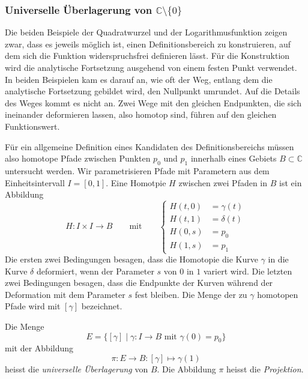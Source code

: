 \subsubsection{Universelle Überlagerung von $\mathbb{C}\setminus\{0\}$}
Die beiden Beispiele der Quadratwurzel und der Logarithmusfunktion
zeigen zwar, dass es jeweils möglich ist, einen Definitionsbereich
zu konstruieren, auf dem sich die Funktion widerspruchsfrei definieren
lässt.
Für die Konstruktion wird die analytische Fortsetzung ausgehend von 
einem festen Punkt verwendet.
In beiden Beispielen kam es darauf an, wie oft der Weg, entlang dem
die analytische Fortsetzung gebildet wird, den Nullpunkt umrundet.
Auf die Details des Weges kommt es nicht an.
Zwei Wege mit den gleichen Endpunkten, die sich ineinander deformieren
lassen, also homotop sind,
%
führen auf den gleichen Funktionswert.

Für ein allgemeine Definition eines Kandidaten des Definitionsbereichs
müssen also homotope Pfade zwischen Punkten $p_0$ und $p_1$ innerhalb
eines Gebiets $B\subset\mathbb{C}$ untersucht werden.
Wir parametrisieren Pfade mit Parametern aus dem Einheitsintervall
$I=[0,1]$.
Eine Homotpie $H$ zwischen zwei Pfaden in $B$ ist ein Abbildung
\[
H\colon I\times I\to B
\qquad\text{mit}\qquad
\left\{
\begin{aligned}
H(t,0) &= \gamma(t) \\
H(t,1) &= \delta(t) \\
H(0,s) &= p_0 \\
H(1,s) &= p_1 
\end{aligned}
\right.
\]
Die ersten zwei Bedingungen besagen, dass die Homotopie die Kurve
$\gamma$ in die Kurve $\delta$ deformiert, wenn der Parameter $s$
von $0$ in $1$ variert wird.
Die letzten zwei Bedingungen besagen, dass die Endpunkte der Kurven
während der Deformation mit dem Parameter $s$ fest bleiben.
Die Menge der zu $\gamma$ homotopen Pfade wird mit $[\gamma]$
bezeichnet.

\begin{definition}
Die Menge
\[
E
=
\{
[\gamma]
\mid
\gamma\colon I\to B
\text{ mit }
\gamma(0)=p_0
\}
\]
mit der Abbildung
\[
\pi
\colon
E\to B
:
[\gamma] \mapsto \gamma(1)
\]
heisst die
\emph{universelle Überlagerung}
%
%
von $B$.
Die Abbildung $\pi$ heisst die \emph{Projektion}.
\end{definition}

